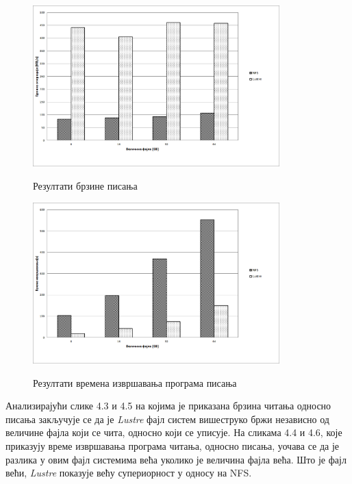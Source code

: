 \begin{figure}[H]
     \centering
         \includegraphics[width=0.85\textwidth]{slike/results/dd_write_speed.png}\\[1cm]
     \caption{Резултати брзине писања}
\end{figure}   
\begin{figure}[H]
      \centering
          \includegraphics[width=0.85\textwidth]{slike/results/dd_write_time.png}\\[1cm]
      \caption{Резултати времена извршавања програма писања}
\end{figure}   
 
Анализирајући слике 4.3 и 4.5 на којима је приказана брзина читања односно писања закључује се да је \textit{Lustre} фајл систем вишеструко бржи независно од величине фајла који се чита, односно који се уписује.
На сликама 4.4 и 4.6, које приказују време извршавања програма читања, односно писања, уочава се да је разлика у овим фајл системима већа уколико је величина фајла већа. Што је фајл већи, \textit{Lustre} показује већу супериорност у односу на NFS.

